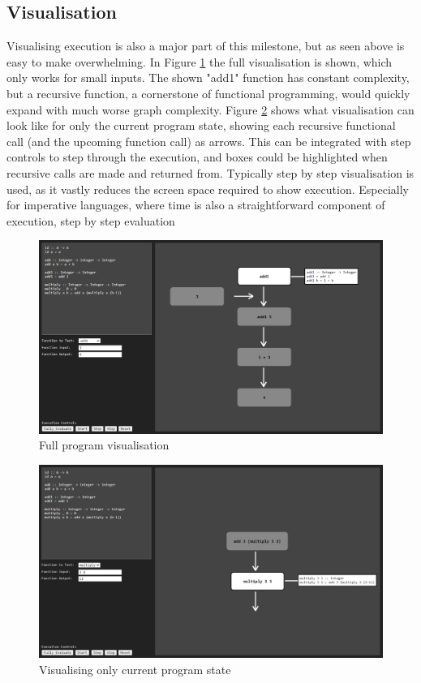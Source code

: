 \documentclass[a4paper]{article}
\begin{document}
\subsection{Visualisation}
Visualising execution is also a major part of this milestone, but as seen above is easy to make overwhelming. In Figure \ref{fig:mockup-1} the full visualisation is shown, which only works for small inputs. The shown "add1" function has constant complexity, but a recursive function, a cornerstone of functional programming, would quickly expand with much worse graph complexity.
Figure \ref{fig:mockup-2} shows what visualisation can look like for only the current program state, showing each recursive functional call (and the upcoming function call) as arrows. This can be integrated with step controls to step through the execution, and boxes could be highlighted when recursive calls are made and returned from.
Typically step by step visualisation is used, as it vastly reduces the screen space required to show execution. Especially for imperative languages, where time is also a straightforward component of execution, step by step evaluation 
\begin{figure}[h]
    \includegraphics[width=\textwidth]{mockup-1}
    \caption{Full program visualisation}
    \label{fig:mockup-1}
\end{figure}
\begin{figure}[h]
    \includegraphics[width=\textwidth]{mockup-2}
    \caption{Visualising only current program state}
    \label{fig:mockup-2}
\end{figure}
\end{document}
